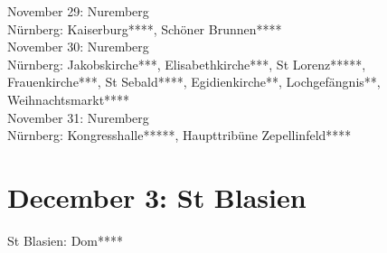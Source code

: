 November 29: Nuremberg\\
N\"urnberg: Kaiserburg****, Sch\"oner Brunnen****\\

November 30: Nuremberg\\
N\"urnberg: Jakobskirche***, Elisabethkirche***, St Lorenz*****, Frauenkirche***, St Sebald****, Egidienkirche**, Lochgef\"angnis**, Weihnachtsmarkt****\\

November 31: Nuremberg\\
N\"urnberg: Kongresshalle*****, Haupttrib\"une Zepellinfeld****

\section{December 3: St Blasien}
\label{2008:StBlasien}

St Blasien: Dom****
